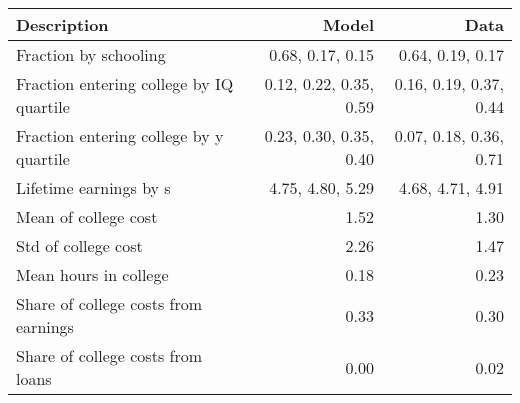 \begin{tabular}{lrr}
\hline
Description & Model  & Data  \\
\hline
Fraction by schooling & 0.68, 0.17, 0.15  & 0.64, 0.19, 0.17  \\
Fraction entering college by IQ quartile & 0.12, 0.22, 0.35, 0.59  & 0.16, 0.19, 0.37, 0.44  \\
Fraction entering college by y quartile & 0.23, 0.30, 0.35, 0.40  & 0.07, 0.18, 0.36, 0.71  \\
Lifetime earnings by s & 4.75, 4.80, 5.29  & 4.68, 4.71, 4.91  \\
Mean of college cost & 1.52  & 1.30  \\
Std of college cost & 2.26  & 1.47  \\
Mean hours in college & 0.18  & 0.23  \\
Share of college costs from earnings & 0.33  & 0.30  \\
Share of college costs from loans & 0.00  & 0.02  \\
\hline
\end{tabular}%
